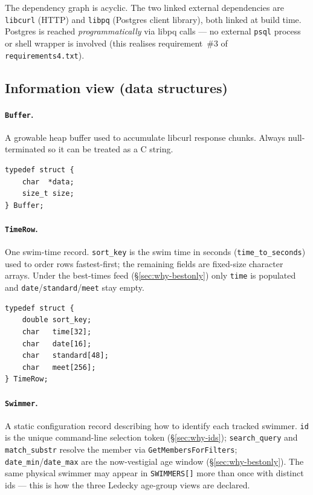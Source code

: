 \documentclass[12pt]{article}
\newcommand{\code}[1]{\texttt{#1}}
\begin{document}
\begin{description}[style=nextline]
The dependency graph is acyclic.  The two linked external
dependencies are \code{libcurl} (HTTP) and \code{libpq} (Postgres
client library), both linked at build time.  Postgres is reached
\emph{programmatically} via libpq calls --- no external
\texttt{psql} process or shell wrapper is involved (this
realises requirement~\#3 of \texttt{requirements4.txt}).

\subsection{Information view (data structures)}

\paragraph{\code{Buffer}.}
A growable heap buffer used to accumulate libcurl response chunks.
Always null-terminated so it can be treated as a C string.

\begin{lstlisting}
typedef struct {
    char  *data;
    size_t size;
} Buffer;
\end{lstlisting}

\paragraph{\code{TimeRow}.}
One swim-time record.  \code{sort\_key} is the swim time in seconds
(\code{time\_to\_seconds}) used to order rows fastest-first; the
remaining fields are fixed-size character arrays.  Under the
best-times feed (\S\ref{sec:why-bestonly}) only \code{time} is
populated and \code{date}/\code{standard}/\code{meet} stay empty.

\begin{lstlisting}
typedef struct {
    double sort_key;
    char   time[32];
    char   date[16];
    char   standard[48];
    char   meet[256];
} TimeRow;
\end{lstlisting}

\paragraph{\code{Swimmer}.}
A static configuration record describing how to identify each
tracked swimmer.  \code{id} is the unique command-line selection
token (\S\ref{sec:why-ids}); \code{search\_query} and
\code{match\_substr} resolve the member via \code{GetMembersForFilters};
\code{date\_min}/\code{date\_max} are the now-vestigial age window
(\S\ref{sec:why-bestonly}).  The same physical swimmer may appear in
\code{SWIMMERS[]} more than once with distinct ids --- this is how the
three Ledecky age-group views are declared.


\end{description}
\end{document}
